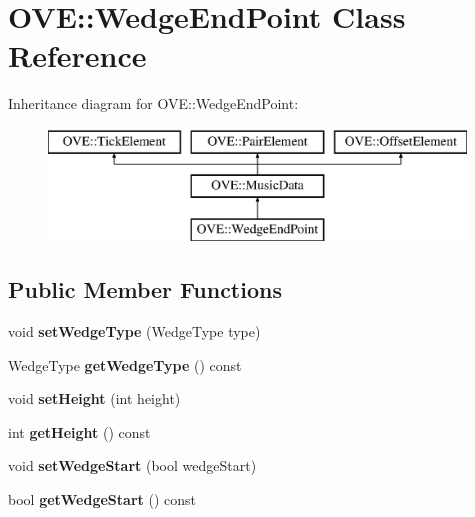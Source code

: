 \hypertarget{class_o_v_e_1_1_wedge_end_point}{}\section{O\+VE\+:\+:Wedge\+End\+Point Class Reference}
\label{class_o_v_e_1_1_wedge_end_point}
Inheritance diagram for O\+VE\+:\+:Wedge\+End\+Point\+:\begin{figure}[H]
\begin{center}
\leavevmode
\includegraphics[height=3.000000cm]{class_o_v_e_1_1_wedge_end_point}
\end{center}
\end{figure}
\subsection*{Public Member Functions}
\begin{DoxyCompactItemize}
\item 
\mbox{\label{class_o_v_e_1_1_wedge_end_point_aee760fe68eba09c02570eeb7df8b95e9}} 
void {\bfseries set\+Wedge\+Type} (Wedge\+Type type)
\item 
\mbox{\label{class_o_v_e_1_1_wedge_end_point_a93b54f3c1fc859ee27a7b15cdc28115a}} 
Wedge\+Type {\bfseries get\+Wedge\+Type} () const
\item 
\mbox{\label{class_o_v_e_1_1_wedge_end_point_a71a48cb0ac817bfad7de3e8ec45c115e}} 
void {\bfseries set\+Height} (int height)
\item 
\mbox{\label{class_o_v_e_1_1_wedge_end_point_a5187f38702077897f765f932a581e9a3}} 
int {\bfseries get\+Height} () const
\item 
\mbox{\label{class_o_v_e_1_1_wedge_end_point_ab3493971313f6735f390d6db5440842f}} 
void {\bfseries set\+Wedge\+Start} (bool wedge\+Start)
\item 
\mbox{\label{class_o_v_e_1_1_wedge_end_point_a765784e47ced27de4679f93337ae02ae}} 
bool {\bfseries get\+Wedge\+Start} () const
\end{DoxyCompactItemize}
